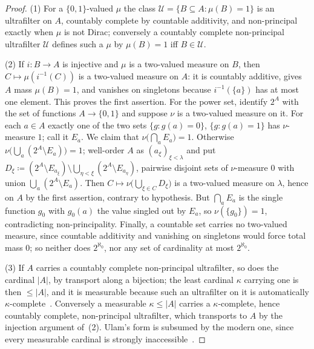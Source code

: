 \documentclass[11pt,a4paper]{article}
\theoremstyle{plain}
\theoremstyle{definition}
\theoremstyle{remark}
\begin{document}
\begin{proof}
(1) For a $\{0,1\}$-valued $\mu$ the class
$\mathcal U = \{B \subseteq A : \mu(B) = 1\}$ is an ultrafilter on $A$,
countably complete by countable additivity, and non-principal exactly when
$\mu$ is not Dirac; conversely a countably complete non-principal ultrafilter
$\mathcal U$ defines such a $\mu$ by $\mu(B) = 1$ iff $B \in \mathcal U$.

(2) If $i \colon B \to A$ is injective and $\mu$ is a two-valued measure on
$B$, then $C \mapsto \mu(i^{-1}(C))$ is a two-valued measure on $A$: it is
countably additive, gives $A$ mass $\mu(B) = 1$, and vanishes on singletons
because $i^{-1}(\{a\})$ has at most one element. This proves the first
assertion. For the power set, identify $2^{A}$ with the set of functions
$A \to \{0,1\}$ and suppose $\nu$ is a two-valued measure on it. For each
$a \in A$ exactly one of the two sets $\{g : g(a) = 0\}$, $\{g : g(a) = 1\}$
has $\nu$-measure $1$; call it $E_a$. We claim that
$\nu\bigl(\bigcap_{a} E_a\bigr) = 1$. Otherwise $\nu\bigl(\bigcup_a (2^{A}
\setminus E_a)\bigr) = 1$; well-order $A$ as $(a_\xi)_{\xi < \lambda}$ and
put $D_\xi \coloneqq (2^{A} \setminus E_{a_\xi}) \setminus
\bigcup_{\eta < \xi} (2^{A} \setminus E_{a_\eta})$, pairwise disjoint sets of
$\nu$-measure $0$ with union $\bigcup_a (2^{A} \setminus E_a)$. Then
$C \mapsto \nu\bigl(\bigcup_{\xi \in C} D_\xi\bigr)$ is a two-valued measure
on $\lambda$, hence on $A$ by the first assertion, contrary to hypothesis.
But $\bigcap_a E_a$ is the single function $g_0$ with $g_0(a)$ the value
singled out by $E_a$, so $\nu(\{g_0\}) = 1$, contradicting non-principality.
Finally, a countable set carries no two-valued measure, since countable
additivity and vanishing on singletons would force total mass $0$; so
neither does $2^{\aleph_0}$, nor any set of cardinality at most
$2^{\aleph_0}$.

(3) If $A$ carries a countably complete non-principal ultrafilter, so does
the cardinal $|A|$, by transport along a bijection; the least cardinal
$\kappa$ carrying one is then $\le |A|$, and it is measurable because such
an ultrafilter on it is automatically
$\kappa$-complete~\cite[Lemma~10.2]{jech_set_2003}. Conversely a measurable
$\kappa \le |A|$ carries a $\kappa$-complete, hence countably complete,
non-principal ultrafilter, which transports to $A$ by the injection argument
of~(2). Ulam's form is subsumed by the modern one, since every measurable
cardinal is strongly inaccessible~\cite[Lemma~10.4]{jech_set_2003}.
\end{proof}
\end{document}
